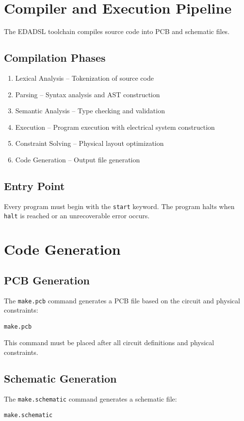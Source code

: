 \chapter{Compiler and Execution Pipeline}
The EDADSL toolchain compiles source code into PCB and schematic files.

\section{Compilation Phases}
\begin{enumerate}
\item Lexical Analysis -- Tokenization of source code
\item Parsing -- Syntax analysis and AST construction
\item Semantic Analysis -- Type checking and validation
\item Execution -- Program execution with electrical system construction
\item Constraint Solving -- Physical layout optimization
\item Code Generation -- Output file generation
\end{enumerate}

\section{Entry Point}
Every program must begin with the \texttt{start} keyword. The program halts when \texttt{halt} is reached or an unrecoverable error occurs.


\chapter{Code Generation}

\section{PCB Generation}
The \texttt{make.pcb} command generates a PCB file based on the circuit and physical constraints:
\begin{verbatim}
make.pcb
\end{verbatim}
This command must be placed after all circuit definitions and physical constraints.

\section{Schematic Generation}
The \texttt{make.schematic} command generates a schematic file:
\begin{verbatim}
make.schematic
\end{verbatim}

